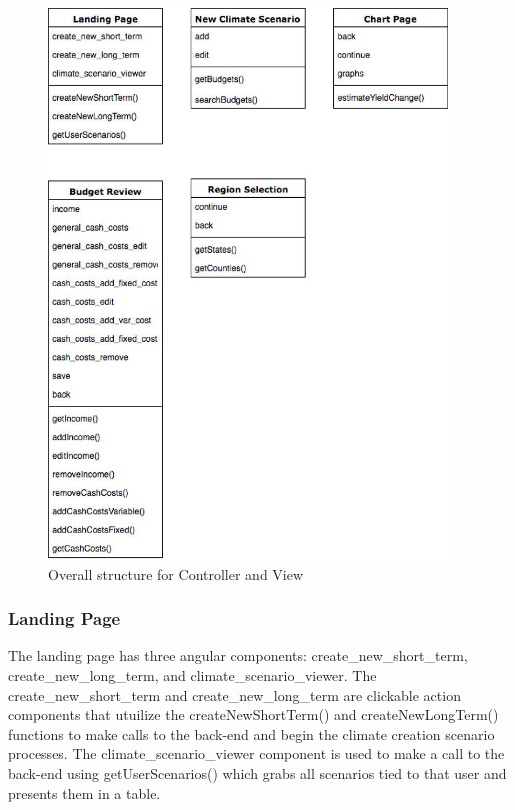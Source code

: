 \documentclass[onecolumn, draftclsnofoot,10pt, compsoc]{article}
\begin{document}
		\clearpage
		\begin{figure}[htb]
		\begin{center}
			\includegraphics[width=300pt]{UMLDiagrams/angularComponents.eps}
		\end{center}
		\caption{Overall structure for Controller and View}
		\label{fig:Angular}
		\end{figure}
		
		\subsubsection{Landing Page}
		 The landing page has three angular components: create\_new\_short\_term, create\_new\_long\_term, and climate\_scenario\_viewer. The create\_new\_short\_term and create\_new\_long\_term are clickable action components that utuilize the createNewShortTerm() and createNewLongTerm() functions to make calls to the back-end and begin the climate creation scenario processes. The climate\_scenario\_viewer component  is used to make a call to the back-end using getUserScenarios() which grabs all scenarios tied to that user and presents them in a table.\\
		
\end{document}

